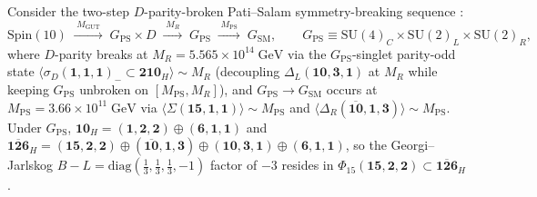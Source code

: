 \documentclass[11pt,a4paper]{article}
\begin{document}
Consider the two-step $D$-parity-broken Pati--Salam symmetry-breaking sequence \cite{PatiSalam1974,Slansky1981,ChangMohapatraParida1984}:
\begin{equation}
\mathrm{Spin}(10) \;\xrightarrow{\;M_{\mathrm{GUT}}\;}\; G_{\mathrm{PS}} \times D \;\xrightarrow{\;M_R\;}\; G_{\mathrm{PS}} \;\xrightarrow{\;M_{\mathrm{PS}}\;}\; G_{\mathrm{SM}}, \qquad
G_{\mathrm{PS}} \equiv \mathrm{SU}(4)_C \times \mathrm{SU}(2)_L \times \mathrm{SU}(2)_R,
\label{eq:consistent-chain}
\end{equation}
where $D$-parity breaks at $M_R = 5.565\times 10^{14}\;\mathrm{GeV}$ via the $G_{\mathrm{PS}}$-singlet parity-odd state $\langle\sigma_D(\mathbf{1},\mathbf{1},\mathbf{1})_- \subset \mathbf{210}_H\rangle \sim M_R$ (decoupling $\Delta_L(\mathbf{10},\mathbf{3},\mathbf{1})$ at $M_R$ while keeping $G_{\mathrm{PS}}$ unbroken on $[M_{\mathrm{PS}}, M_R]$), and $G_{\mathrm{PS}} \to G_{\mathrm{SM}}$ occurs at $M_{\mathrm{PS}} = 3.66\times 10^{11}\;\mathrm{GeV}$ via $\langle\Sigma(\mathbf{15},\mathbf{1},\mathbf{1})\rangle \sim M_{\mathrm{PS}}$ and $\langle\Delta_R(\overline{\mathbf{10}},\mathbf{1},\mathbf{3})\rangle \sim M_{\mathrm{PS}}$. Under $G_{\mathrm{PS}}$, $\mathbf{10}_H = (\mathbf{1},\mathbf{2},\mathbf{2}) \oplus (\mathbf{6},\mathbf{1},\mathbf{1})$ and $\overline{\mathbf{126}}_H = (\mathbf{15},\mathbf{2},\mathbf{2}) \oplus (\overline{\mathbf{10}},\mathbf{1},\mathbf{3}) \oplus (\mathbf{10},\mathbf{3},\mathbf{1}) \oplus (\mathbf{6},\mathbf{1},\mathbf{1})$, so the Georgi--Jarlskog $B - L = \mathrm{diag}(\frac{1}{3},\frac{1}{3},\frac{1}{3},-1)$ factor of $-3$ resides in $\Phi_{15}(\mathbf{15},\mathbf{2},\mathbf{2}) \subset \overline{\mathbf{126}}_H$.
\end{document}
